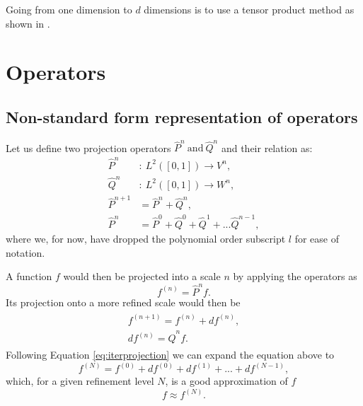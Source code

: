 \documentclass[../master_thesis.tex]{subfiles}
\begin{document}
Going from one dimension to $d$ dimensions is to use a tensor product method as shown in
\cite{Frediani:2013}.

\section{Operators}
\subsection{Non-standard form representation of operators}\label{NSformsec}
Let us define two projection operators $\hat{P}^n \ \text{and}\ \hat{Q}^n $  and their relation as:
\begin{align}
  \hat{P}^n &: \ L^2([0, 1]) \to V^n, \\
  \hat{Q}^n &:\  L^2([0, 1]) \to W^n, \\
  \hat{P}^{n+1} &= \hat{P}^n + \hat{Q}^n,\\
  \hat{P}^n &= \hat{P}^0 + \hat{Q}^0 + \hat{Q}^1 + ...  \hat{Q}^{n-1},\label{eq:iterprojection}
\end{align}
where we, for now, have dropped the polynomial order subscript $l$ for ease of
notation.

A function $f$ would then be projected into a scale $n$ by applying the
operators as \cite{Frediani:2013}
\begin{equation}
   f^{(n)} = \hat{P}^n f.
\end{equation}
Its projection onto a more refined scale would then be \cite{Frediani:2013}
\begin{align}\label{eq:refinef}
  \begin{split}
    f^ {(n+1)} = f^{(n)} + df^{(n)},\\
    df^{(n)} = \hat{Q}^nf.
  \end{split}
\end{align}
Following Equation \ref{eq:iterprojection} we can expand the equation above to
\begin{equation}
  f^{(N)} = f^{(0)} + df^{(0)} + df^{(1)} + ... + df^{(N-1)},
\end{equation}
which, for a given refinement level $N$, is a good approximation of $f$
\begin{equation}
  f \approx f^{(N)}.
\end{equation}
\end{document}

